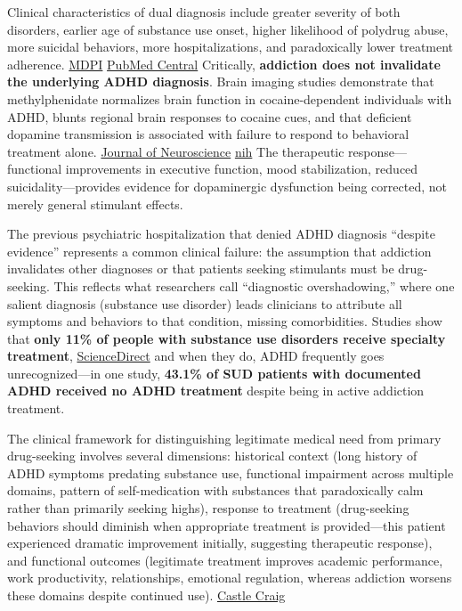 Clinical characteristics of dual diagnosis include greater severity of both disorders, earlier age of substance use onset, higher likelihood of polydrug abuse, more suicidal behaviors, more hospitalizations, and paradoxically lower treatment adherence. \href{https://www.mdpi.com/2077-0383/12/9/3096}{MDPI} \href{https://pmc.ncbi.nlm.nih.gov/articles/PMC4414493/}{PubMed Central} Critically, \textbf{addiction does not invalidate the underlying ADHD diagnosis}. Brain imaging studies demonstrate that methylphenidate normalizes brain function in cocaine-dependent individuals with ADHD, blunts regional brain responses to cocaine cues, and that deficient dopamine transmission is associated with failure to respond to behavioral treatment alone. \href{https://www.jneurosci.org/content/24/49/11017}{Journal of Neuroscience} \href{https://pmc.ncbi.nlm.nih.gov/articles/PMC4227391/}{nih} The therapeutic response---functional improvements in executive function, mood stabilization, reduced suicidality---provides evidence for dopaminergic dysfunction being corrected, not merely general stimulant effects.

The previous psychiatric hospitalization that denied ADHD diagnosis ``despite evidence'' represents a common clinical failure: the assumption that addiction invalidates other diagnoses or that patients seeking stimulants must be drug-seeking. This reflects what researchers call ``diagnostic overshadowing,'' where one salient diagnosis (substance use disorder) leads clinicians to attribute all symptoms and behaviors to that condition, missing comorbidities. Studies show that \textbf{only 11\% of people with substance use disorders receive specialty treatment}, \href{https://www.sciencedirect.com/science/article/abs/pii/S0165178123004870}{ScienceDirect} and when they do, ADHD frequently goes unrecognized---in one study, \textbf{43.1\% of SUD patients with documented ADHD received no ADHD treatment} despite being in active addiction treatment.

The clinical framework for distinguishing legitimate medical need from primary drug-seeking involves several dimensions: historical context (long history of ADHD symptoms predating substance use, functional impairment across multiple domains, pattern of self-medication with substances that paradoxically calm rather than primarily seeking highs), response to treatment (drug-seeking behaviors should diminish when appropriate treatment is provided---this patient experienced dramatic improvement initially, suggesting therapeutic response), and functional outcomes (legitimate treatment improves academic performance, work productivity, relationships, emotional regulation, whereas addiction worsens these domains despite continued use). \href{https://www.castlecraig.co.uk/dual-diagnosis/adhd/}{Castle Craig}

